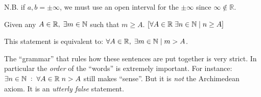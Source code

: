 \documentclass[10pt]{scrartcl}
\begin{document}
N.B. if $a,b = \pm \infty$, we must use an open interval for the $\pm \infty$ since $\infty \notin \mathbb{R}$.\\


\vspace*{10pt}

\begin{axiom}[Archimedean]
Given any  $A \in \mathbb{R}, \; \exists m \in \mathbb{N}$ such that $m \geq A$. $ [\forall A \in \mathbb{R} \; \exists n \in \mathbb{N} \;|\; n \geq A]$ 
\end{axiom}



This statement is equivalent to: $\forall A \in \mathbb{R}, \; \exists m \in \mathbb{N} \; | \; m > A$. 

The ``grammar'' that rules how these sentences are put together is very strict. In particular the \emph{order} of the ``words'' is extremely important. For instance: $\exists n \in \mathbb{N} \; : \; \forall A \in \mathbb{R} \; n > A$ still makes ``sense''. But it is \emph{not} the Archimedean axiom. It is an \emph{utterly false} statement.\\
\end{document}
